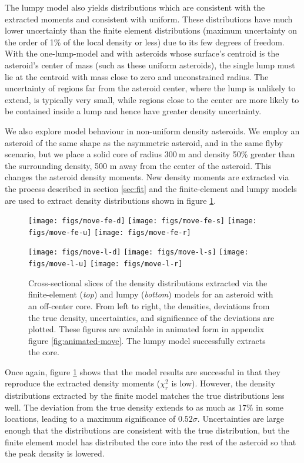 \documentclass[fleqn,usenatbib]{mnras}
\begin{document}
The lumpy model also yields distributions which are consistent with the extracted moments and consistent with uniform. These distributions have much lower uncertainty than the finite element distributions (maximum uncertainty on the order of 1\% of the local density or less) due to its few degrees of freedom. With the one-lump-model and with asteroids whose surface's centroid is the asteroid's center of mass (such as these uniform asteroids), the single lump must lie at the centroid with mass close to zero and unconstrained radius. The uncertainty of regions far from the asteroid center, where the lump is unlikely to extend, is typically very small, while regions close to the center are more likely to be contained inside a lump and hence have greater density uncertainty.

We also explore model behaviour in non-uniform density asteroids. We employ an asteroid of the same shape as the asymmetric asteroid, and in the same flyby scenario, but we place a solid core of radius $\SI{300}{\meter}$ and density 50\% greater than the surrounding density, 500 m away from the center of the asteroid. This changes the asteroid density moments. New density moments are extracted via the process described in section \ref{sec:fit} and the finite-element and lumpy models are used to extract density distributions shown in figure \ref{fig:den-move}.

\begin{figure}
  \texttt{[image: figs/move-fe-d]}\hfill
  \texttt{[image: figs/move-fe-s]}\hfill
  \texttt{[image: figs/move-fe-u]}\hfill
  \texttt{[image: figs/move-fe-r]}

  \texttt{[image: figs/move-l-d]}\hfill
  \texttt{[image: figs/move-l-s]}\hfill
  \texttt{[image: figs/move-l-u]}\hfill
  \texttt{[image: figs/move-l-r]}

  \caption{Cross-sectional slices of the density distributions extracted via the finite-element (\textit{top}) and lumpy (\textit{bottom}) models for an asteroid with an off-center core. From left to right, the densities, deviations from the true density, uncertainties, and significance of the deviations are plotted. These figures are available in animated form in appendix figure \ref{fig:animated-move}. The lumpy model successfully extracts the core.}
  \label{fig:den-move}
\end{figure}

Once again, figure \ref{fig:den-move} shows that the model results are successful in that they reproduce the extracted density moments ($\chi^2_r$ is low). However, the density distributions extracted by the finite model matches the true distributions less well. The deviation from the true density extends to as much as 17\% in some locations, leading to a maximum significance of $0.52\sigma$. Uncertainties are large enough that the distributions are consistent with the true distribution, but the finite element model has distributed the core into the rest of the asteroid so that the peak density is lowered.
\end{document}
